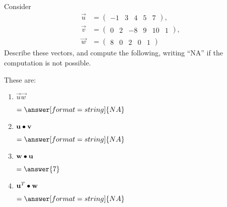 \documentclass{ximera}
\author{Parisa Fatheddin}
\begin{document}
\begin{exercise}

Consider
\begin{align*}
  \vec{u} &= \begin{pmatrix} -1 & 3 & 4 & 5 & 7
  \end{pmatrix},\\
  \vec{v} &= \begin{pmatrix}
0 & 2 & -8 & 9 & 10 & 1
  \end{pmatrix},\\
  \vec{w} &= \begin{pmatrix}
8 & 0 & 2 & 0 & 1
\end{pmatrix}
\end{align*}
Describe these vectors, and compute the following, writing ``NA'' if the
computation is not possible.  \begin{prompt}These are:
  \begin{multipleChoice}
    \pdfOnly{\end{multicols}}
  \end{multipleChoice}
\end{prompt}
  \begin{enumerate}
  \item $\vec{u}\vec{w}$ \begin{prompt} $= \answer[format=string]{NA}$\end{prompt}
  \item $\mathbf{u} \bullet \mathbf{v}$ \begin{prompt} $= \answer[format=string]{NA}$\end{prompt}
  \item $\mathbf{w} \bullet \mathbf{u}$ \begin{prompt} $= \answer{7}$\end{prompt}
  \item $\mathbf{u}^{T} \bullet \mathbf{w}$ \begin{prompt} $= \answer[format=string]{NA}$\end{prompt}
      \pdfOnly{\end{multicols}}
      \end{enumerate}
\end{exercise}
\end{document}
